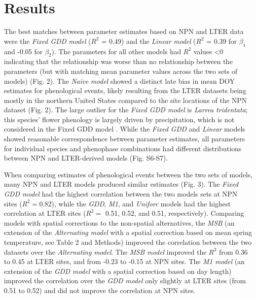 \documentclass[fleqn,12pt,lineno]{article}
\begin{document}
\section*{Results}

The best matches between parameter estimates based on NPN and LTER data were the \textit{Fixed GDD model} ($R^2$ = 0.49) and the \textit{Linear model} ($R^2$ = 0.39 for $\beta_{1}$ and -0.05 for $\beta_{2}$). The parameters for all other models had $R^2$ values \textless 0 indicating that the relationship was worse than no relationship between the parameters (but with matching mean parameter values across the two sets of models) (Fig. 2). The \textit{Naive model} showed a distinct late bias in mean DOY estimates for phenological events, likely resulting from the LTER datasets being mostly in the northern United States compared to the site locations of the NPN dataset (Fig. 2). The large outlier for the \textit{Fixed GDD model} is \textit{Larrea tridentata}; this species' flower phenology is largely driven by precipitation, which is not considered in the Fixed GDD model \citep{beatley1974}. While the \textit{Fixed GDD} and \textit{Linear} models showed reasonable correspondence between parameter estimates, all parameters for individual species and phenophase combinations had different distributions between NPN and LTER-derived models (Fig. S6-S7).

When comparing estimates of phenological events between the two sets of models, many NPN and LTER models produced similar estimates (Fig. 3). The \textit{Fixed GDD model} had the highest correlation between the two models sets at NPN sites ($R^2 = 0.82$), while the \textit{GDD}, \textit{M1}, and \textit{Uniforc} models had the highest correlation at LTER sites ($R^2 =$ 0.51, 0.52, and 0.51, respectively). Comparing models with spatial corrections to the non-spatial alternatives, the \textit{MSB} (an extension of the \textit{Alternating model} with a spatial correction based on mean spring temperature, see Table 2 and Methods) improved the correlation between the two datasets over the \textit{Alternating model}. The \textit{MSB model} improved the $R^2$ from 0.36 to 0.45 at LTER sites, and from -0.23 to -0.15 at NPN sites. The \textit{M1 model} (an extension of the \textit{GDD model} with a spatial correction based on day length) improved the correlation over the \textit{GDD model} only slightly at LTER sites (from 0.51 to 0.52) and did not improve the correlation at NPN sites. 
\end{document}
